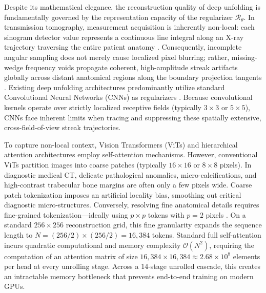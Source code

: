 \documentclass[runningheads]{llncs}
\begin{document}
Despite its mathematical elegance, the reconstruction quality of deep unfolding is fundamentally governed by the representation capacity of the regularizer $\mathcal{R}_{\theta}$. In transmission tomography, measurement acquisition is inherently non-local: each sinogram detector value represents a continuous line integral along an X-ray trajectory traversing the entire patient anatomy \cite{kak2001principles}. Consequently, incomplete angular sampling does not merely cause localized pixel blurring; rather, missing-wedge frequency voids propagate coherent, high-amplitude streak artifacts globally across distant anatomical regions along the boundary projection tangents \cite{bui2026mva}. Existing deep unfolding architectures predominantly utilize standard Convolutional Neural Networks (CNNs) as regularizers \cite{chen2018learn,ronneberger2015u}. Because convolutional kernels operate over strictly localized receptive fields (typically $3 \times 3$ or $5 \times 5$), CNNs face inherent limits when tracing and suppressing these spatially extensive, cross-field-of-view streak trajectories.

To capture non-local context, Vision Transformers (ViTs) \cite{dosovitskiy2020vit,vaswani2017attention} and hierarchical attention architectures \cite{liu2021swin} employ self-attention mechanisms. However, conventional ViTs partition images into coarse patches (typically $16 \times 16$ or $8 \times 8$ pixels). In diagnostic medical CT, delicate pathological anomalies, micro-calcifications, and high-contrast trabecular bone margins are often only a few pixels wide. Coarse patch tokenization imposes an artificial locality bias, smoothing out critical diagnostic micro-structures. Conversely, resolving fine anatomical details requires fine-grained tokenization---ideally using $p \times p$ tokens with $p = 2$ pixels \cite{bui2026mva}. On a standard $256 \times 256$ reconstruction grid, this fine granularity expands the sequence length to $N = (256/2) \times (256/2) = 16,384$ tokens. Standard full self-attention incurs quadratic computational and memory complexity $\mathcal{O}(N^2)$, requiring the computation of an attention matrix of size $16,384 \times 16,384 \approx 2.68 \times 10^8$ elements per head at every unrolling stage. Across a 14-stage unrolled cascade, this creates an intractable memory bottleneck that prevents end-to-end training on modern GPUs.
\end{document}
